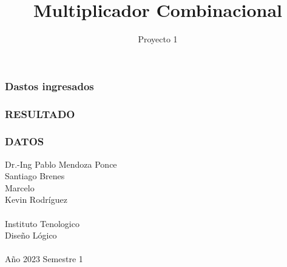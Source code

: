 \documentclass{beamer}
\begin{document}
\title{Multiplicador Combinacional}
\author{Proyecto 1}

\begin{frame}
\frametitle{Dastos ingresados}
\end{frame}

\begin{frame}
\frametitle{RESULTADO}

\end{frame}

\begin{frame}
\frametitle{DATOS}
Dr.-Ing Pablo Mendoza Ponce\\
Santiago Brenes\\
Marcelo\\
Kevin Rodr\'iguez\\\\
Instituto Tenologico\\
Dise\~{n}o L\'ogico\\\\
A\~{n}o 2023 Semestre 1
\end{frame}
\end{document}
